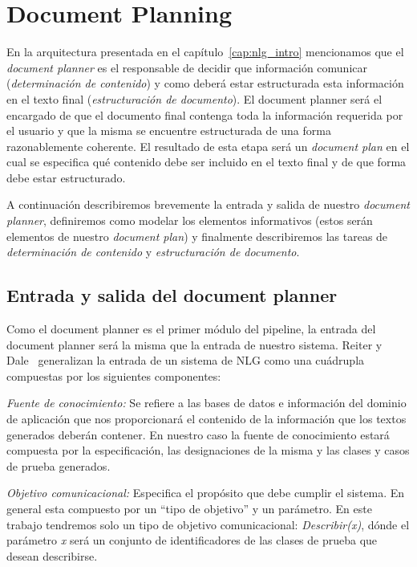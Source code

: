 \chapter{Document Planning}
\label{cap:document_planning}

En la arquitectura presentada en el capítulo~\ref{cap:nlg_intro} mencionamos que el \emph{document planner} es el responsable de decidir que información comunicar (\emph{determinación de contenido}) y como deberá estar estructurada esta información en el texto final (\emph{estructuración de documento}). El document planner será el encargado de que el documento final contenga toda la información requerida por el usuario y que la misma se encuentre estructurada de una forma razonablemente coherente. El resultado de esta etapa será un \emph{document plan} en el cual se especifica qué contenido debe ser incluido en el texto final y de que forma debe estar estructurado.


A continuación describiremos brevemente la entrada y salida de nuestro \emph{document planner}, definiremos como modelar los elementos informativos (estos serán elementos de nuestro \emph{document plan}) y finalmente describiremos las tareas de \emph{determinación de contenido} y \emph{estructuración de documento}.

\section{Entrada y salida del document planner}
Como el document planner es el primer módulo del pipeline, la entrada del document planner será la misma que la entrada de nuestro sistema. Reiter y Dale~\cite{reiter_dale} generalizan la entrada de un sistema de NLG  como una cuádrupla compuestas por los siguientes componentes:

\bigskip
\noindent
\emph{Fuente de conocimiento:} Se refiere a las bases de datos e información del dominio de aplicación que nos proporcionará el contenido de la información que los textos generados deberán contener.
En nuestro caso la fuente de conocimiento estará compuesta por la especificación, las designaciones de la misma y las clases y casos de prueba generados.

\bigskip
\noindent
\emph{Objetivo comunicacional:} Especifica el propósito que debe cumplir el sistema. En general esta compuesto por un ``tipo de objetivo'' y un parámetro.
En este trabajo tendremos solo un tipo de objetivo comunicacional: \emph{Describir(x)}, dónde el parámetro \emph{x} será un conjunto de identificadores de las clases de prueba que desean describirse.

